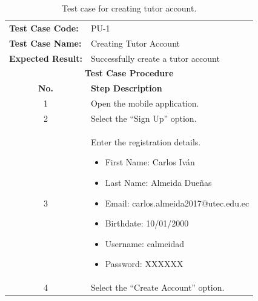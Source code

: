 \documentclass[a4paper,fleqn]{cas-sc}
\begin{document}
			\begin{table}[hbt!]
				\centering
				\caption{Test case for creating tutor account.}
				\label{tab:create-tutor-account-test-case}
				\begin{tabularx}{\textwidth}{l X}
					\toprule
					\textbf{Test Case Code:} & PU-1 \\
					\textbf{Test Case Name:} & Creating Tutor Account \\
					\textbf{Expected Result:} & Successfully create a tutor account \\
					\midrule
					\multicolumn{2}{c}{\textbf{Test Case Procedure}} \\
					\midrule
					\multicolumn{1}{c}{\textbf{No.}} & \textbf{Step Description} \\
					\midrule
					\multicolumn{1}{c}{1} & Open the mobile application. \\
					\multicolumn{1}{c}{2} & Select the ``Sign Up'' option. \\
					\multicolumn{1}{c}{3} & Enter the registration details.
					\begin{itemize}
						\item First Name: Carlos Iván
						\item Last Name: Almeida Dueñas
						\item Email: carlos.almeida2017@utec.edu.ec
						\item Birthdate: 10/01/2000
						\item Username: calmeidad
						\item Password: XXXXXX
					\end{itemize}\\
					\multicolumn{1}{c}{4} & Select the ``Create Account'' option. \\
					\bottomrule
				\end{tabularx}
			\end{table}
			
\end{document}

